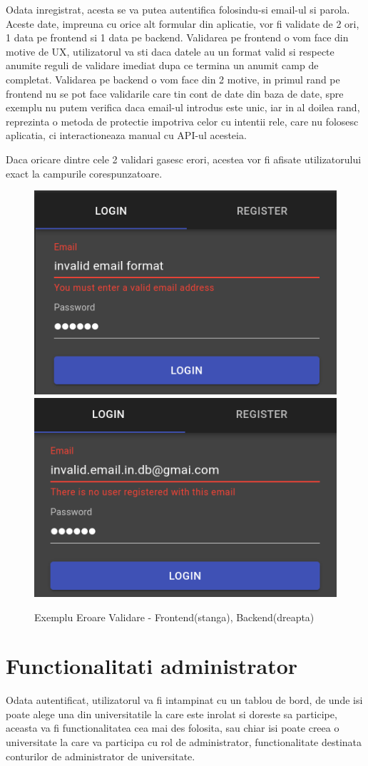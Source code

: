 \documentclass[12pt, a4paper, oneside, romanian]{teza-upb}
\begin{document}
Odata inregistrat, acesta se va putea autentifica folosindu-si email-ul si parola.\\

Aceste date, impreuna cu orice alt formular din aplicatie, vor fi validate de 2 ori, 1 data pe frontend si 1 data pe backend. Validarea pe frontend o vom face din motive de UX, utilizatorul va sti daca datele au un format valid si respecte anumite reguli de validare imediat dupa ce termina un anumit camp de completat. Validarea pe backend o vom face din 2 motive, in primul rand pe frontend nu se pot face validarile care tin cont de date din baza de date, spre exemplu nu putem verifica daca email-ul introdus este unic, iar in al doilea rand, reprezinta o metoda de protectie impotriva celor cu intentii rele, care nu folosesc aplicatia, ci interactioneaza manual cu API-ul acesteia.

Daca oricare dintre cele 2 validari gasesc erori, acestea vor fi afisate utilizatorului exact la campurile corespunzatoare.

\begin{figure}[H]
\centering
\includegraphics*[width=0.45\columnwidth]{exemplu-eroare-validare-frontend}
\includegraphics*[width=0.45\columnwidth]{exemplu-eroare-validare-backend}
\caption{Exemplu Eroare Validare - Frontend(stanga), Backend(dreapta)}
\label{exemplu-eroare-validare}
\end{figure}

\section{Functionalitati administrator}

Odata autentificat, utilizatorul va fi intampinat cu un tablou de bord, de unde isi poate alege una din universitatile la care este inrolat si doreste sa participe, aceasta va fi functionalitatea cea mai des folosita, sau chiar isi poate creea o universitate la care va participa cu rol de administrator, functionalitate destinata conturilor de administrator de universitate.
\end{document}
